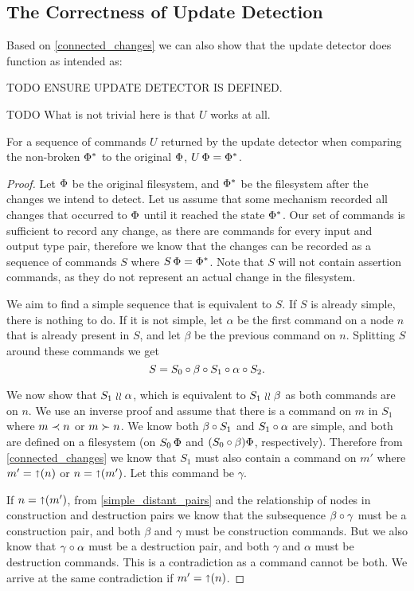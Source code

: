 
\subsection{The Correctness of Update Detection}

Based on \cref{connected_changes} we can also show that
the update detector does function as intended as:

TODO ENSURE UPDATE DETECTOR IS DEFINED.

TODO What is not trivial here is that $U$ works at all.

\begin{myth}
For a sequence of commands $U$ returned by the update detector
when comparing the non-broken $\Phi^*$ to the original $\Phi$,
$U\,\Phi = \Phi^*$.
\end{myth}
\begin{proof}
Let $\Phi$ be the original filesystem, and $\Phi^*$
be the filesystem after the changes we intend to detect.
Let us assume that some mechanism recorded all changes that occurred
to $\Phi$ until it reached the state $\Phi^*$.
Our set of commands is sufficient to record any change, as
there are commands for every input and output type pair, therefore
we know that the changes can be recorded as a sequence of commands $S$
where $S\,\Phi=\Phi^*$.
Note that $S$ will not contain assertion commands, as they do not
represent an actual change in the filesystem.

\newcommand{\ucx}{\alpha}
\newcommand{\ucy}{\beta}
\newcommand{\ucz}{\gamma}

We aim to find a simple sequence that is equivalent to $S$.
If $S$ is already simple, there is nothing to do.
If it is not simple, let $\ucx$ be the first command
on a node $n$ that is already present in $S$,
and let $\ucy$ be the previous command on $n$.
Splitting $S$ around these commands we get
\[ S = S_0 \cc \ucy \cc S_1 \cc \ucx \cc S_2. \]

We now show that $S_1\indep\ucx$,
which is equivalent to $S_1\indep\ucy$ as both commands are on $n$.
We use an inverse proof and assume that there is a command on $m$ in $S_1$
where $m\prec n$ or $m\succ n$.
We know both $\ucy\cc S_1$ and $S_1\cc\ucx$ are simple,
and both are defined on a filesystem
(on $S_0\,\Phi$ and $(S_0\mathbin{\circ}\beta)\Phi$, respectively).
Therefore from \cref{connected_changes} we know that
$S_1$ must also contain a command on $m'$ where
$m'=\mathord{\shortuparrow}({n})$ or $n=\mathord{\shortuparrow}({m'})$.
Let this command be $\ucz$.

If $n=\mathord{\shortuparrow}({m'})$,
from \cref{simple_distant_pairs} 
and the relationship of nodes in construction and destruction pairs
we know that the subsequence
$\ucy\cc\ucz$ must be a construction pair,
and both $\ucy$ and $\ucz$ must be construction commands.
But we also know that $\ucz\cc\ucx$ must be a destruction pair,
and both $\ucz$ and $\ucx$ must be destruction commands.
This is a contradiction as a command cannot be both.
We arrive at the same contradiction if $m'=\mathord{\shortuparrow}({n})$.


\end{proof}
